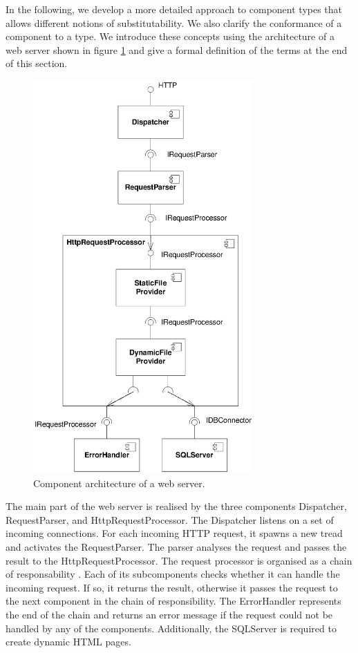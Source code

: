 In the following, we develop a more detailed approach to component types that
allows different notions of substitutability. We also clarify the conformance of
a component to a type. We introduce these concepts using the architecture of a
web server shown in figure \ref{fig:WebserverComponents} and give a formal
definition of the terms at the end of this section.

\begin{figure}[htbp]
\centering
\includegraphics[width=3.3in]{example/WebserverComponents}
\caption{Component architecture of a web server.}
\label{fig:WebserverComponents}
\end{figure}

The main part of the web server is realised by the three components Dispatcher,
RequestParser, and HttpRequestProcessor. The Dispatcher listens on a set of
incoming connections. For each incoming HTTP request, it spawns a new tread and
activates the RequestParser. The parser analyses the request and passes the
result to the HttpRequestProcessor. The request processor is organised as a
chain of responsability \cite{gamma1995a}. Each of its subcomponents checks
whether it can handle the incoming request. If so, it returns the result,
otherwise it passes the request to the next component in the chain of
responsibility. The ErrorHandler represents the end of the chain and returns an
error message if the request could not be handled by any of the components.
Additionally, the SQLServer is required to create dynamic HTML pages.


